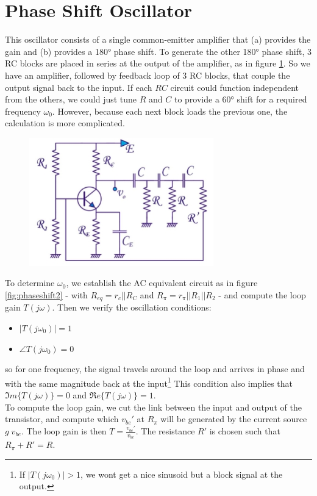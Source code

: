 \section{Phase Shift Oscillator}
This oscillator consists of a single common-emitter amplifier that (a) provides the gain and (b) provides a 180° phase shift. To generate the other 180° phase shift, $3$ RC blocks are placed in series at the output of the amplifier, as in figure \ref{fig:phaseshift1}. So we have an amplifier, followed by feedback loop of 3 RC blocks, that couple the output signal back to the input.  If each $RC$ circuit could function independent from the others, we could just tune $R$ and $C$ to provide a $60$° shift for a required frequency $\omega_0$. However, because each next block loads the previous one, the calculation is more complicated.\\
\begin{figure}[h!]
	\centering
	\includegraphics[width=8cm]{figures/ch11/phaseshift1.jpg}
	\caption{}
	\label{fig:phaseshift1}
\end{figure}
To determine $\omega_0$, we establish the AC equivalent circuit as in figure \ref{fig:phaseshift2}  - with $R_{eq} = r_c || R_C$ and $R_\pi = r_\pi || R_1 || R_2$ - and compute the loop gain $T(j\omega)$. Then we verify the oscillation conditions:
\begin{itemize}
	\item $|T(j\omega_0)| = 1$
	\item $\angle T(j\omega_0) = 0$
\end{itemize}
so for one frequency, the signal travels around the loop and arrives in phase and with the same magnitude back at the input\footnote{If $|T(j\omega_0)| > 1$, we wont get a nice sinusoid but a block signal at the output.} This condition also implies that $\Im m\{T(j\omega)\} = 0$ and $\Re e\{T(j\omega)\} = 1$.\\
To compute the loop gain, we cut the link between the input and output of the transistor, and compute which $v_{be}'$ at $R_\pi$ will be generated by the current source $g\;v_{be}$. The loop gain is then $T = \frac{v_{be}'}{v_{be}}$. The resistance $R'$ is chosen such that $R_\pi + R'  = R$.\\
